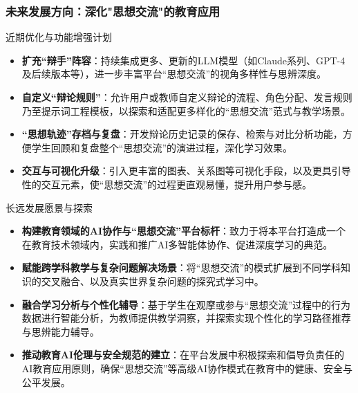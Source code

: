 \documentclass[aspectratio=169]{beamer} %
\begin{document}
\begin{frame}[allowframebreaks]
\frametitle{未来发展方向：深化"思想交流"的教育应用}
\begin{block}{近期优化与功能增强计划}
\begin{itemize}
    \item \textbf{扩充“辩手”阵容}：持续集成更多、更新的LLM模型（如Claude系列、GPT-4及后续版本等），进一步丰富平台“思想交流”的视角多样性与思辨深度。
    \item \textbf{自定义“辩论规则”}：允许用户或教师自定义辩论的流程、角色分配、发言规则乃至提示词工程模板，以探索和适配更多样化的“思想交流”范式与教学场景。
    \item \textbf{“思想轨迹”存档与复盘}：开发辩论历史记录的保存、检索与对比分析功能，方便学生回顾和复盘整个“思想交流”的演进过程，深化学习效果。
    \item \textbf{交互与可视化升级}：引入更丰富的图表、关系图等可视化手段，以及更具引导性的交互元素，使“思想交流”的过程更直观易懂，提升用户参与感。
\end{itemize}
\end{block}

\begin{block}{长远发展愿景与探索}
\begin{itemize}
    \item \textbf{构建教育领域的AI协作与“思想交流”平台标杆}：致力于将本平台打造成一个在教育技术领域内，实践和推广AI多智能体协作、促进深度学习的典范。
    \item \textbf{赋能跨学科教学与复杂问题解决场景}：将“思想交流”的模式扩展到不同学科知识的交叉融合、以及真实世界复杂问题的探究式学习中。
    \item \textbf{融合学习分析与个性化辅导}：基于学生在观摩或参与“思想交流”过程中的行为数据进行智能分析，为教师提供教学洞察，并探索实现个性化的学习路径推荐与思辨能力辅导。
    \item \textbf{推动教育AI伦理与安全规范的建立}：在平台发展中积极探索和倡导负责任的AI教育应用原则，确保“思想交流”等高级AI协作模式在教育中的健康、安全与公平发展。
\end{itemize}
\end{block}
\end{frame}
\end{document}
